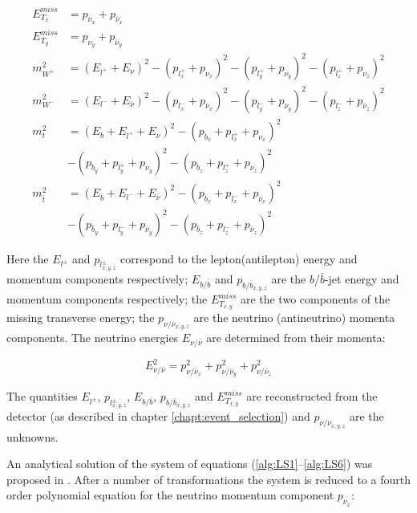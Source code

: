 \begin{align}\label{alg:LS1}
 E^{miss}_{T_{x}} & =  p_{\nu_{x}} + p_{\bar{\nu}_{x}} \\
 E^{miss}_{T_{y}} & =  p_{\nu_{y}} + p_{\bar{\nu}_{y}} \\
 m^{2}_{W^{+}} & = (E_{l^{+}} + E_{\nu})^{2} - (p_{l^{+}_{x}} + p_{\nu_{x}})^{2} - (p_{l^{+}_{y}} + p_{\nu_{y}})^{2} - (p_{l^{+}_{z}} + p_{\nu_{z}})^2 \\
 m^{2}_{W^{-}} & = (E_{l^{-}} + E_{\bar{\nu}})^{2} - (p_{l^{-}_{x}} + p_{\bar{\nu}_{x}})^{2} - (p_{l^{-}_{y}} + p_{\bar{\nu}_{y}})^{2} - (p_{l^{-}_{z}} + p_{\bar{\nu}_{z}})^2 \\
 m_{t}^{2} & = (E_{b} + E_{l^{+}} + E_{\nu})^{2} - (p_{b_{x}} + p_{l^{+}_{x}} + p_{\nu_{x}})^2 \nonumber \\
           & - (p_{b_{y}} + p_{l^{+}_{y}} + p_{\nu_{y}})^2 - (p_{b_{z}} + p_{l^{+}_{z}} + p_{\nu_{z}})^2 \\
 m_{\bar{t}}^{2} & = (E_{\bar{b}} + E_{l^{-}} + E_{\bar{\nu}})^{2} - (p_{\bar{b}_{x}} + p_{l^{-}_{x}} + p_{\bar{\nu}_{x}})^2 \nonumber \\
                 & - (p_{\bar{b}_{y}} + p_{l^{-}_{y}} + p_{\bar{\nu}_{y}})^2 - (p_{\bar{b}_{z}} + p_{l^{-}_{z}} + p_{\bar{\nu}_{z}})^2\label{alg:LS6} 
\end{align}

Here the $E_{l^{\pm}}$ and $p_{l^{\pm}_{x,y,z}}$ correspond to the lepton(antilepton) energy and momentum components respectively; 
$E_{b/\bar{b}}$ and $p_{b/\bar{b}_{x,y,z}}$ are the $b$/$\bar{b}$-jet energy and momentum components respectively; the $E^{miss}_{T_{x,y}}$ are
the two components of the missing transverse energy; the $p_{\nu/\bar{\nu}_{x,y,z}}$ are the neutrino (antineutrino) momenta components.
The neutrino energies $ E_{\nu/\bar{\nu}}$ are determined from their momenta:

\begin{equation}
 E_{\nu/\bar{\nu}}^{2} = p_{\nu/\bar{\nu}_{x}}^{2} + p_{\nu/\bar{\nu}_{y}}^{2} + p_{\nu/\bar{\nu}_{z}}^{2}
\end{equation}

The quantities $E_{l^{\pm}}$, $p_{l^{\pm}_{x,y,z}}$, $E_{b/\bar{b}}$, $p_{b/\bar{b}_{x,y,z}}$ and $E^{miss}_{T_{x,y}}$ are reconstructed from the detector (as described in chapter \ref{chapt:event_selection})
and $p_{\nu/\bar{\nu}_{x,y,z}}$ are the unknowns.

An analytical solution of the system of equations (\ref{alg:LS1}--\ref{alg:LS6}) was proposed in \cite{LSpaper}. After a number of transformations
the system is reduced to a fourth order polynomial equation for the neutrino momentum component $p_{\nu_{x}}$:

